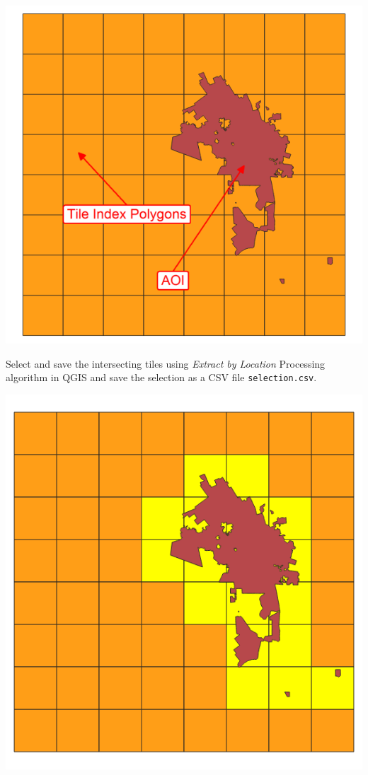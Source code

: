 \documentclass[12pt,a4paper]{article}
\begin{document}
\begin{center}\includegraphics{images/gdal/aoiselection} \end{center}

Select and save the intersecting tiles using \emph{Extract by Location}
Processing algorithm in QGIS and save the selection as a CSV file
\texttt{selection.csv}.

\begin{center}\includegraphics{images/gdal/aoiselected} \end{center}
\end{document}

